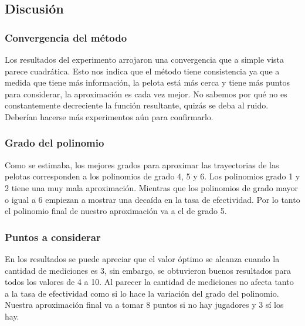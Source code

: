 \subsection{Discusión}
\subsubsection{Convergencia del método}
Los resultados del experimento arrojaron una convergencia que a simple vista parece cuadrática. Esto nos indica que el método tiene 
consistencia ya que a medida que tiene más información, la pelota está más cerca y tiene más puntos para considerar, la aproximación
es cada vez mejor. No sabemos por qué no es constantemente decreciente la función resultante, quizás se deba al ruido. Deberían
hacerse más experimentos aún para confirmarlo.

\subsubsection{Grado del polinomio}
Como se estimaba, los mejores grados para aproximar las trayectorias de las pelotas corresponden a los polinomios de grado 4, 5 y 6. 
Los polinomios grado 1 y 2 tiene una muy mala aproximación. Mientras que los polinomios de grado mayor o igual a 6 empiezan a mostrar 
una decaída en la tasa de efectividad. Por lo tanto el polinomio final de nuestro aproximación va a el de grado 5.

\subsubsection{Puntos a considerar}
En los resultados se puede apreciar que el valor óptimo se alcanza cuando la cantidad de mediciones es 3, sin embargo, se obtuvieron 
buenos resultados para todos los valores de 4 a 10. Al parecer la cantidad de mediciones no afecta tanto a la tasa de efectividad como 
si lo hace la variación del grado del polinomio. Nuestra aproximación final va a tomar 8 puntos si no hay jugadores y 3 sí los hay.



